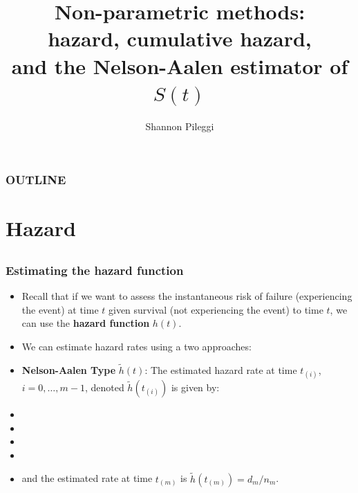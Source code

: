 



\title[Set 6]{Non-parametric methods: \\ hazard, cumulative hazard, \\ and the Nelson-Aalen estimator of $S(t)$}
\author[Pileggi]{Shannon Pileggi}


\date{}




\begin{frame}
\titlepage
\end{frame}

\begin{frame}
\frametitle{OUTLINE\qquad\qquad\qquad} \tableofcontents[hideallsubsections]
\end{frame}


\section[Hazard]{Hazard}
\subsection{}

\begin{frame}
\frametitle{Estimating the hazard function}
\begin{itemize}
\item Recall that if we want to assess the instantaneous risk of failure (experiencing the event) at time $t$ given survival (not experiencing the event) to
time $t$, we can use the \textbf{hazard function} $h(t)$.

\item We can estimate hazard rates using a two approaches:
\item \textbf{Nelson-Aalen Type} $\tilde{h}(t)$: The estimated hazard rate at time $t_{(i)}$, $i =0,\dots,m-1$,
    denoted $\tilde{h}(t_{(i)})$ is given by:
    \item[]
   \item[]
   \item[]
   \item[]
   \item[]   and the estimated rate at time $t_{(m)}$ is $\tilde{h}(t_{(m)})= d_m/n_m$.

\end{itemize}
\end{frame}

